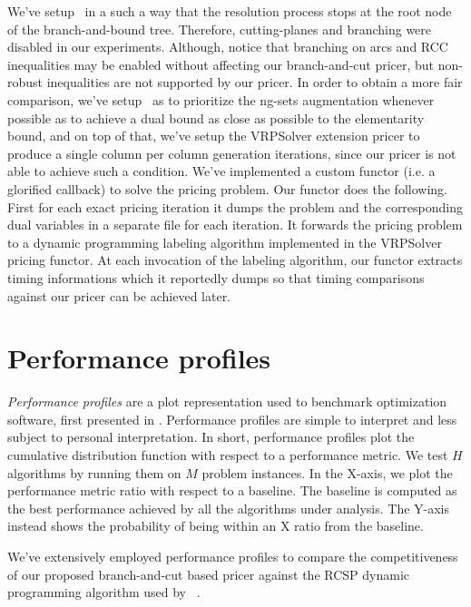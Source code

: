 We've setup \bapcod\ in a such a way that the resolution process stops at the root
node of the branch-and-bound tree.
Therefore, cutting-planes and branching were disabled in our experiments.
Although, notice that branching on arcs and RCC inequalities may be
enabled without affecting our branch-and-cut pricer, but non-robust
inequalities are not supported by our pricer.
In order to obtain a more fair comparison, we've setup \bapcod\ as to prioritize
the ng-sets augmentation whenever possible as to achieve a dual bound as close
as possible to the elementarity bound, and on top of that,
we've setup the VRPSolver extension pricer to produce a single column
per column generation iterations, since our pricer is not able to achieve
such a condition.
We've implemented a custom functor (i.e. a glorified callback) to solve the pricing problem.
Our functor does the following.
First for each exact pricing iteration it dumps the problem and the corresponding dual variables
in a separate file for each iteration.
It forwards the pricing problem to a dynamic programming labeling algorithm
implemented in the VRPSolver pricing functor.
At each invocation of the labeling algorithm, our functor extracts timing informations
which it reportedly dumps so that timing comparisons against our pricer can be achieved later.

\section{Performance profiles}
\label{sec:results-performance-profiles}

\textit{Performance profiles} are a plot representation used to benchmark optimization software,
first presented in \textcite{dolan2002}.
Performance profiles are simple to interpret and less subject to personal interpretation.
In short, performance profiles plot the cumulative distribution function with respect to a performance metric.
We test $H$ algorithms by running them on $M$ problem instances.
In the X-axis, we plot the performance metric ratio with respect to a baseline.
The baseline is computed as the best performance achieved by all the algorithms under analysis.
The Y-axis instead shows the probability of being within an X ratio from the baseline.

\medskip

We've extensively employed performance profiles to compare the competitiveness of
our proposed branch-and-cut based pricer
against the RCSP dynamic programming algorithm used by \bapcod\ \parencite{pessoa2020a}.

